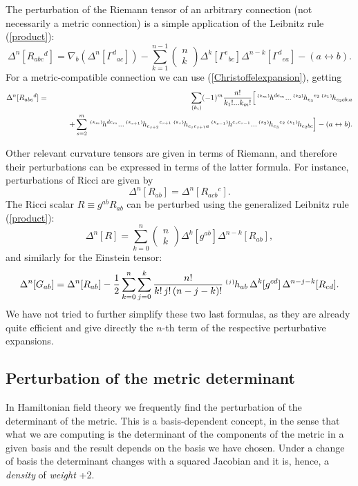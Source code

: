 \documentclass[aps,prd,showpacs]{revtex4}
\newcommand{\h}[1]{{}^{\mbox{\,\tiny $\{#1\}\!$}}h}
\newcommand{\binomial}[2]{
    \left( \begin{array}{c} {#1} \\ {#2} \end{array} \right)
}
\begin{document}
The perturbation of the Riemann tensor of an arbitrary connection (not
necessarily a metric connection) is a simple application of the
Leibnitz rule (\ref{product}):
\begin{equation}\label{pertRiemann}
\Delta^n[R_{abc}{}^d] =
\nabla_b\left(\Delta^n[\Gamma^d{}_{ac}]\right) -
\sum_{k=1}^{n-1} \binomial{n}{k}
\Delta^k[\Gamma^e{}_{bc}]
\Delta^{n-k}[\Gamma^d{}_{ea}] -
(a\leftrightarrow b).
\end{equation}
For a metric-compatible connection we can use (\ref{Christoffelexpansion}),
getting
\begin{eqnarray} \label{pertRiemann2}
\Delta^n[R_{abc}{}^d] &=&
\sum_{(k_i)} (-1)^m \frac{n!}{k_1!...k_m!} \Big[
\h{k_m}^{de_m}...\h{k_2}_{e_3}{}^{e_2}
\h{k_1}_{e_2cb;a} \\
 && \qquad + \sum_{s=2}^{m}
\h{k_m}^{de_m}...
\h{k_{s+1}}_{e_{s+2}}{}^{e_{s+1}}
\h{k_s}_{e_se_{s+1}a}
\h{k_{s-1}}^{e_se_{s-1}}...
\h{k_2}_{e_3}{}^{e_2}
\h{k_1}_{e_2bc} \Big]
- (a\leftrightarrow b). \nonumber
\end{eqnarray}

Other relevant curvature tensors are given in terms of Riemann, and
therefore their perturbations can be expressed in terms of the latter
formula. For instance, perturbations of Ricci are given by
\begin{equation}\label{pertRicci}
\Delta^n[R_{ab}] = \Delta^n[R_{acb}{}^c].
\end{equation}
The Ricci scalar $R\equiv g^{ab}R_{ab}$ can be perturbed using the
generalized Leibnitz rule (\ref{product}):
\begin{equation}\label{pertRicciScalar}
\Delta^n[R] = \sum_{k=0}^n \binomial{n}{k}
\Delta^k[g^{ab}]\Delta^{n-k}[R_{ab}] ,
\end{equation}
and similarly for the Einstein tensor:
\begin{equation}\label{pertEinstein}
\Delta^n[G_{ab}]=\Delta^n[R_{ab}]
-\frac{1}{2}\sum_{k=0}^{n}\sum_{j=0}^{k}
\frac{n!}{k!\,j!\,(n-j-k)!}
\h{j}_{ab}\,\Delta^k[g^{cd}]\,\Delta^{n-j-k}[R_{cd}].
\end{equation}
We have not tried to further simplify these two last formulas, as they
are already quite efficient and give directly the $n$-th term of the
respective perturbative expansions.

\subsection{Perturbation of the metric determinant}
In Hamiltonian field theory we frequently find the perturbation of the
determinant of the metric. This is a basis-dependent concept, in the
sense that what we are computing is the determinant of the components of
the metric in a given basis and the result depends on the basis we have
chosen. Under a change of basis the determinant changes with a squared
Jacobian and it is, hence, a {\em density} of {\em weight} +2.
\end{document}
